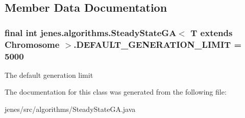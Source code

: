 \subsection{Member Data Documentation}
\hypertarget{classjenes_1_1algorithms_1_1_steady_state_g_a_3_01_t_01extends_01_chromosome_01_4_ad510a7e4a856de7b2c9d021b2f66a5ac}{
\subsubsection[{D\-E\-F\-A\-U\-L\-T\-\_\-\-G\-E\-N\-E\-R\-A\-T\-I\-O\-N\-\_\-\-L\-I\-M\-I\-T}]{\setlength{\rightskip}{0pt plus 5cm}final int jenes.\-algorithms.\-Steady\-State\-G\-A$<$ T extends Chromosome $>$.D\-E\-F\-A\-U\-L\-T\-\_\-\-G\-E\-N\-E\-R\-A\-T\-I\-O\-N\-\_\-\-L\-I\-M\-I\-T = 5000\hspace{0.3cm}{\ttfamily [static]}}}\label{classjenes_1_1algorithms_1_1_steady_state_g_a_3_01_t_01extends_01_chromosome_01_4_ad510a7e4a856de7b2c9d021b2f66a5ac}
The default generation limit 

The documentation for this class was generated from the following file\-:\begin{DoxyCompactItemize}
\item 
jenes/src/algorithms/Steady\-State\-G\-A.\-java\end{DoxyCompactItemize}
